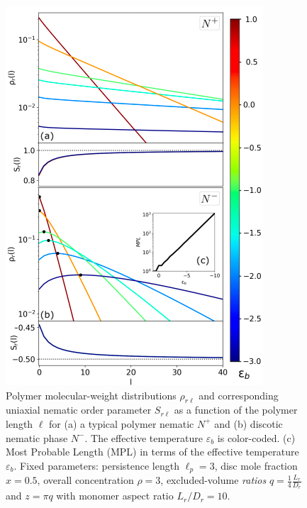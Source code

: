 \begin{figure}
  \includegraphics[width=\linewidth]{figures/chapter-3/FIG2}
  \caption{Polymer molecular-weight distributions $\rho_{r \ell}$ and corresponding  uniaxial nematic order parameter $S_{r \ell}$ as a function of the polymer length $\ell$ for (a) a typical polymer nematic $N^{+}$ and (b) discotic nematic phase $N^{-}$. The effective temperature $\varepsilon_{b}$ is color-coded.   
  (c) Most Probable Length (MPL) in terms of the effective temperature $\varepsilon_{b}$. Fixed parameters: persistence length $\ell_{p} = 3$, disc mole fraction $x = 0.5$, overall concentration $\rho = 3$, excluded-volume {\em ratios} $q = \frac{1}{4}\frac{L_{r}}{D_{r}}$ and $z=\pi q$ with monomer aspect ratio $L_{r}/D_{r} =10$.  }
  \label{fig:distributions}
\end{figure}
 
